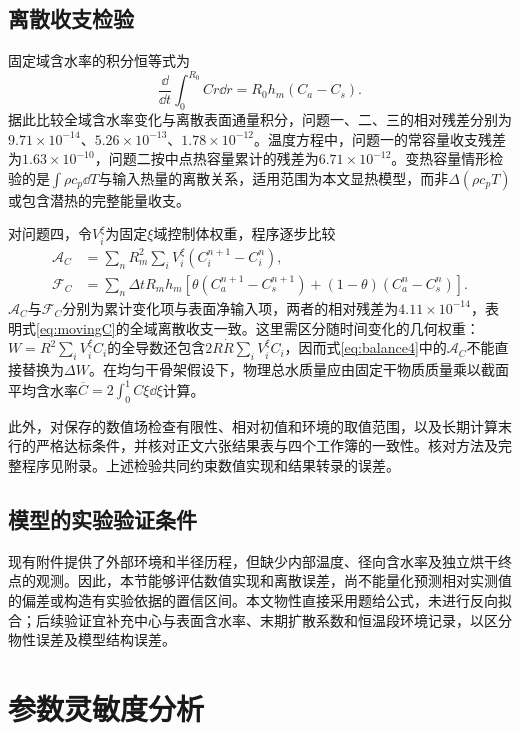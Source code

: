 \subsection{离散收支检验}
固定域含水率的积分恒等式为
\begin{equation}
\frac{\dd}{\dd t}\int_0^{R_0}Cr\dd r=R_0h_m(C_a-C_s).
\end{equation}
据此比较全域含水率变化与离散表面通量积分，问题一、二、三的相对残差分别为$9.71\times10^{-14}$、$5.26\times10^{-13}$、$1.78\times10^{-12}$。温度方程中，问题一的常容量收支残差为$1.63\times10^{-10}$，问题二按中点热容量累计的残差为$6.71\times10^{-12}$。变热容量情形检验的是$\int\rho c_p\dd T$与输入热量的离散关系，适用范围为本文显热模型，而非$\Delta(\rho c_pT)$或包含潜热的完整能量收支。

对问题四，令$V_i^\xi$为固定$\xi$域控制体权重，程序逐步比较
\begin{equation}
\begin{aligned}
\mathcal A_C&=\sum_n R_m^2\sum_iV_i^\xi(C_i^{n+1}-C_i^n),\\
\mathcal F_C&=\sum_n\Delta tR_mh_m\left[\theta(C_a^{n+1}-C_s^{n+1})
+(1-\theta)(C_a^n-C_s^n)\right].
\end{aligned}
\label{eq:balance4}
\end{equation}
$\mathcal A_C$与$\mathcal F_C$分别为累计变化项与表面净输入项，两者的相对残差为$4.11\times10^{-14}$，表明式\eqref{eq:movingC}的全域离散收支一致。这里需区分随时间变化的几何权重：$W=R^2\sum_iV_i^\xi C_i$的全导数还包含$2R\dot R\sum_iV_i^\xi C_i$，因而式\eqref{eq:balance4}中的$\mathcal A_C$不能直接替换为$\Delta W$。在均匀干骨架假设下，物理总水质量应由固定干物质质量乘以截面平均含水率$\overline C=2\int_0^1C\xi\dd\xi$计算。

此外，对保存的数值场检查有限性、相对初值和环境的取值范围，以及长期计算末行的严格达标条件，并核对正文六张结果表与四个工作簿的一致性。核对方法及完整程序见附录。上述检验共同约束数值实现和结果转录的误差。

\subsection{模型的实验验证条件}
现有附件提供了外部环境和半径历程，但缺少内部温度、径向含水率及独立烘干终点的观测。因此，本节能够评估数值实现和离散误差，尚不能量化预测相对实测值的偏差或构造有实验依据的置信区间。本文物性直接采用题给公式，未进行反向拟合；后续验证宜补充中心与表面含水率、末期扩散系数和恒温段环境记录，以区分物性误差及模型结构误差。
\FloatBarrier

\section{参数灵敏度分析}
